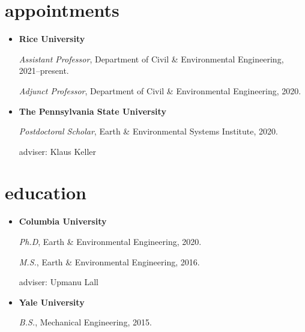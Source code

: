 \documentclass[10pt,oneside]{article}
\begin{document}

\section{appointments}

\mbox{}\vspace{-\dimexpr\baselineskip\relax}

\begin{itemize}[label={}]
  
  \item \textbf{Rice University}
        
        \textit{Assistant Professor}, Department of Civil \& Environmental Engineering, 2021--present.
        
        
        \textit{Adjunct Professor}, Department of Civil \& Environmental Engineering, 2020.
        
        
        
  \item \textbf{The Pennsylvania State University}
        
        \textit{Postdoctoral Scholar}, Earth \& Environmental Systems Institute, 2020.
        
        adviser: Klaus Keller
        
        
        
\end{itemize}


\section{education}

\mbox{}\vspace{-\dimexpr\baselineskip\relax}

\begin{itemize}[label={}]
  
  \item \textbf{Columbia University}
        
        \textit{Ph.D}, Earth \& Environmental Engineering, 2020.
        
        \textit{M.S.}, Earth \& Environmental Engineering, 2016.
        
        
        adviser: Upmanu Lall
        
        
  \item \textbf{Yale University}
        
        \textit{B.S.}, Mechanical Engineering, 2015.
        
        
        
\end{itemize}
\end{document}
